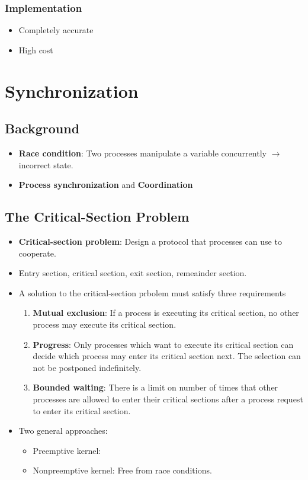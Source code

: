 \documentclass[10pt]{report}
\begin{document}
		\subsection{Implementation}
			\begin{itemize}
				\item Completely accurate
				\item High cost
			\end{itemize}

\chapter{Synchronization} \label{ch:Chapter6}
	\section{Background}
		\begin{itemize}
			\item \textbf{Race condition}: Two processes manipulate a variable concurrently $\rightarrow$ incorrect state.
			\item \textbf{Process synchronization} and \textbf{Coordination}
		\end{itemize}

	\section{The Critical-Section Problem}
		\begin{itemize}
			\item \textbf{Critical-section problem}: Design a protocol that processes can use to cooperate.
			\item Entry section, critical section, exit section, remeainder section.
			\item A solution to the critical-section prbolem must satisfy three requirements
			\begin{enumerate}
				\item \textbf{Mutual exclusion}: If a process is executing its critical section, no other process may execute its critical section.
				\item \textbf{Progress}: Only processes which want to execute its critical section can decide which process may enter its critical section next. The selection can not be postponed indefinitely.
				\item \textbf{Bounded waiting}: There is a limit on number of times that other processes are allowed to enter their critical sections after a process request to enter its critical section.
			\end{enumerate}
			\item Two general approaches:
			\begin{itemize}
				\item Preemptive kernel:
				\item Nonpreemptive kernel: Free from race conditions.
			\end{itemize}
		\end{itemize}
\end{document}
